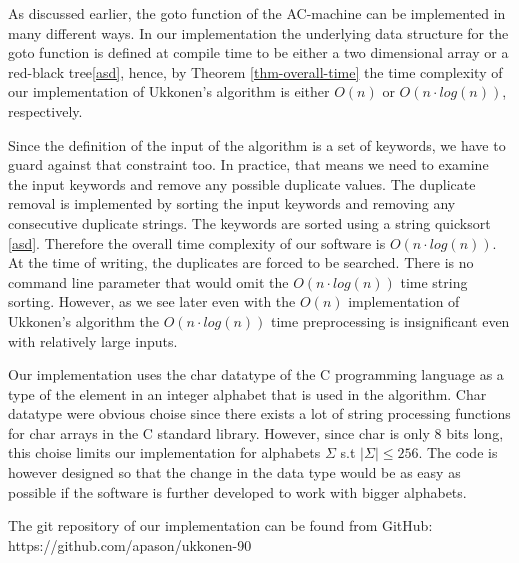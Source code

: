 \documentclass[english,twoside,censored,csm,algorithms-track-2020]{HYthesisML}
\theoremstyle{plain}
\theoremstyle{definition}
\begin{document}
As discussed earlier, the goto function of the AC-machine can be implemented in many different
ways. In our implementation the underlying data structure for the goto function is defined at compile
time to be either a two dimensional array or a red-black tree\ref{asd}, hence, by Theorem \ref{thm-overall-time}
the time complexity of our implementation of Ukkonen's algorithm is either $O(n)$ or $O(n\cdot log(n))$,
respectively.

Since the definition of the input of the algorithm is a set of keywords, we have to guard against that
constraint too. In practice, that means we need to examine the input keywords and remove any possible
duplicate values. The duplicate removal is implemented by sorting the input keywords and removing any
consecutive duplicate strings. The keywords are sorted using a string quicksort \ref{asd}.
Therefore the overall time complexity of our software is $O(n\cdot log(n))$. At the time of writing, the
duplicates are forced to be searched. There is no command line parameter that would omit the 
$O(n\cdot log(n))$ time string sorting. However, as we see later even with the $O(n)$ implementation
of Ukkonen's algorithm the $O(n\cdot log(n))$ time preprocessing is insignificant even with relatively
large inputs.

Our implementation uses the char datatype of the C programming language as a type of the element
in an integer alphabet that is used in the algorithm. Char datatype were obvious choise since
there exists a lot of string processing functions for char arrays in the C standard library.
However, since char is only 8 bits long, this choise limits our implementation for alphabets
$\Sigma$ s.t $|\Sigma| \leq 256$. The code is however designed so that the change in the
data type would be as easy as possible if the software is further developed to work with
bigger alphabets. 

The git repository of our implementation can be found from GitHub: https://github.com/apason/ukkonen-90

\end{document}
